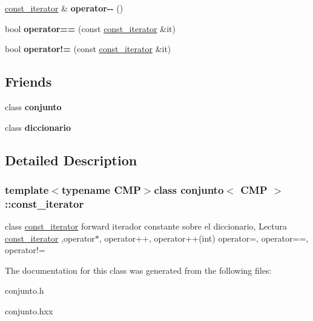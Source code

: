 \begin{DoxyCompactItemize}
\item 
\hypertarget{classconjunto_1_1const__iterator_a88c0fa127bc36fa925e80e532b59055d}{}\hyperlink{classconjunto_1_1const__iterator}{const\+\_\+iterator} \& {\bfseries operator-\/-\/} ()\label{classconjunto_1_1const__iterator_a88c0fa127bc36fa925e80e532b59055d}

\item 
\hypertarget{classconjunto_1_1const__iterator_aa51158e92aeeec4c65ba9a4ba8047cbd}{}bool {\bfseries operator==} (const \hyperlink{classconjunto_1_1const__iterator}{const\+\_\+iterator} \&it)\label{classconjunto_1_1const__iterator_aa51158e92aeeec4c65ba9a4ba8047cbd}

\item 
\hypertarget{classconjunto_1_1const__iterator_a433c34257914c399d1eff2a1c9b1030d}{}bool {\bfseries operator!=} (const \hyperlink{classconjunto_1_1const__iterator}{const\+\_\+iterator} \&it)\label{classconjunto_1_1const__iterator_a433c34257914c399d1eff2a1c9b1030d}

\end{DoxyCompactItemize}
\subsection*{Friends}
\begin{DoxyCompactItemize}
\item 
\hypertarget{classconjunto_1_1const__iterator_a42fdcda39c77eabd7380e29fcdbe5dd2}{}class {\bfseries conjunto}\label{classconjunto_1_1const__iterator_a42fdcda39c77eabd7380e29fcdbe5dd2}

\item 
\hypertarget{classconjunto_1_1const__iterator_a44955070f60117521fa6b406a83e6d4d}{}class {\bfseries diccionario}\label{classconjunto_1_1const__iterator_a44955070f60117521fa6b406a83e6d4d}

\end{DoxyCompactItemize}


\subsection{Detailed Description}
\subsubsection*{template$<$typename C\+M\+P$>$class conjunto$<$ C\+M\+P $>$\+::const\+\_\+iterator}

class \hyperlink{classconjunto_1_1const__iterator}{const\+\_\+iterator} forward iterador constante sobre el diccionario, Lectura \hyperlink{classconjunto_1_1const__iterator}{const\+\_\+iterator} ,operator$\ast$, operator++, operator++(int) operator=, operator==, operator!= 

The documentation for this class was generated from the following files\+:\begin{DoxyCompactItemize}
\item 
conjunto.\+h\item 
conjunto.\+hxx\end{DoxyCompactItemize}
